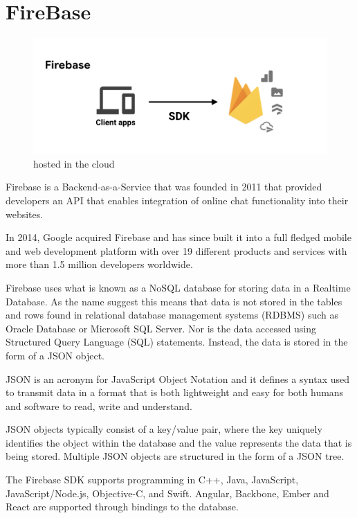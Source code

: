 \section{FireBase}

\begin{figure}[ht]
    \centering
    \includegraphics[scale=0.8]{img/firebase2.PNG}
    \caption{hosted in the cloud}
    \label{fig:my_label}
\end{figure}

Firebase is a Backend-as-a-Service that was founded in 2011 that provided developers an API that enables integration of online chat functionality into their websites. 

In 2014, Google acquired Firebase and has since built it into a full fledged mobile and web development platform with over 19 different products and services with more than 1.5 million developers worldwide.

Firebase uses what is known as a NoSQL database for storing data in a Realtime Database. As the name suggest this means that data is not stored in the tables and rows found in relational database management systems (RDBMS) such as Oracle Database or Microsoft SQL Server. Nor is the data accessed using Structured Query Language (SQL) statements. Instead, the data is stored in the form of a JSON object. 

JSON is an acronym for JavaScript Object Notation and it defines a syntax used to transmit data in a format that is both lightweight and easy for both humans and software to read, write and understand.

JSON objects typically consist of a key/value pair, where the key uniquely identifies the object within the database and the value represents the data that is being stored. Multiple JSON objects are structured in the form of a JSON tree.

The Firebase SDK supports programming in C++, Java, JavaScript, JavaScript/Node.js, Objective-C, and Swift. Angular, Backbone, Ember and React are supported through bindings to the database.\cite{firebase}


